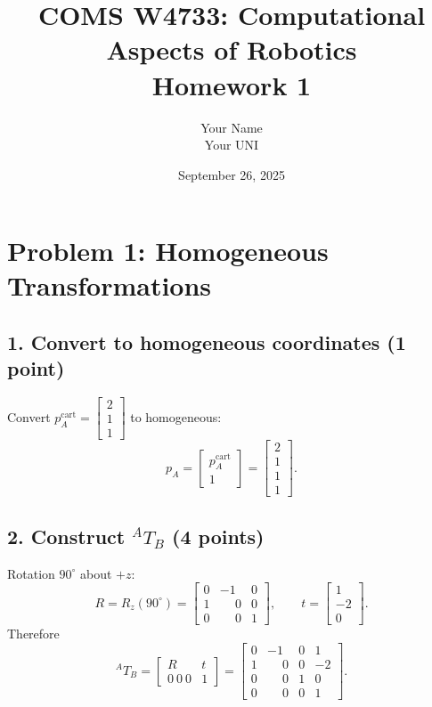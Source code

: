 \documentclass[11pt]{article}
\title{COMS W4733: Computational Aspects of Robotics\\Homework 1}
\author{Your Name \\ Your UNI}
\date{September 26, 2025}
\begin{document}
\maketitle

\section*{Problem 1: Homogeneous Transformations}

\subsection*{1. Convert to homogeneous coordinates (1 point)}
Convert $p_A^{\text{cart}} = \begin{bmatrix} 2 \\ 1 \\ 1 \end{bmatrix}$ to homogeneous:
\[
p_A = \begin{bmatrix} p_A^{\text{cart}} \\ 1 \end{bmatrix}
= \begin{bmatrix} 2 \\ 1 \\ 1 \\ 1 \end{bmatrix}.
\]

\subsection*{2. Construct $^{A}\!T_{B}$ (4 points)}
Rotation $90^\circ$ about $+z$:
\[
R = R_z(90^\circ) =
\begin{bmatrix}
0 & -1 & 0\\
1 & \phantom{-}0 & 0\\
0 & \phantom{-}0 & 1
\end{bmatrix},
\qquad
t = \begin{bmatrix} 1 \\ -2 \\ 0 \end{bmatrix}.
\]
Therefore
\[
^{A}\!T_{B}=\begin{bmatrix}R&t\\0~0~0&1\end{bmatrix}
=
\begin{bmatrix}
0 & -1 & 0 & 1\\
1 & \phantom{-}0 & 0 & -2\\
0 & \phantom{-}0 & 1 & 0\\
0 & \phantom{-}0 & 0 & 1
\end{bmatrix}.
\]
\end{document}
